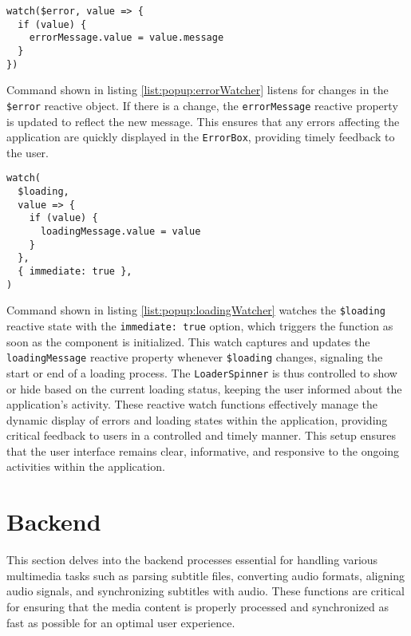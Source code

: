 \begin{clisting}
\label{list:popup:errorWatcher}
\begin{verbatim}
watch($error, value => {
  if (value) {
    errorMessage.value = value.message
  }
})
\end{verbatim}
\end{clisting}
\noindent Command shown in listing \ref{list:popup:errorWatcher} listens for changes in the \texttt{\$error} reactive object. If there is a change, the \texttt{errorMessage} reactive property is updated to reflect the new message. This ensures that any errors affecting the application are quickly displayed in the \texttt{ErrorBox}, providing timely feedback to the user.

\begin{clisting}
\label{list:popup:loadingWatcher}
\begin{verbatim}
watch(
  $loading,
  value => {
    if (value) {
      loadingMessage.value = value
    }
  },
  { immediate: true },
)
\end{verbatim}
\end{clisting}

\noindent Command shown in listing \ref{list:popup:loadingWatcher} watches the \texttt{\$loading} reactive state with the \texttt{immediate: true} option, which triggers the function as soon as the component is initialized. This watch captures and updates the \texttt{loadingMessage} reactive property whenever \texttt{\$loading} changes, signaling the start or end of a loading process. The \texttt{LoaderSpinner} is thus controlled to show or hide based on the current loading status, keeping the user informed about the application's activity.
These reactive watch functions effectively manage the dynamic display of errors and loading states within the application, providing critical feedback to users in a controlled and timely manner. This setup ensures that the user interface remains clear, informative, and responsive to the ongoing activities within the application.

\section{Backend}

This section delves into the backend processes essential for handling various multimedia tasks such as parsing subtitle files, converting audio formats, aligning audio signals, and synchronizing subtitles with audio. These functions are critical for ensuring that the media content is properly processed and synchronized as fast as possible for an optimal user experience.

